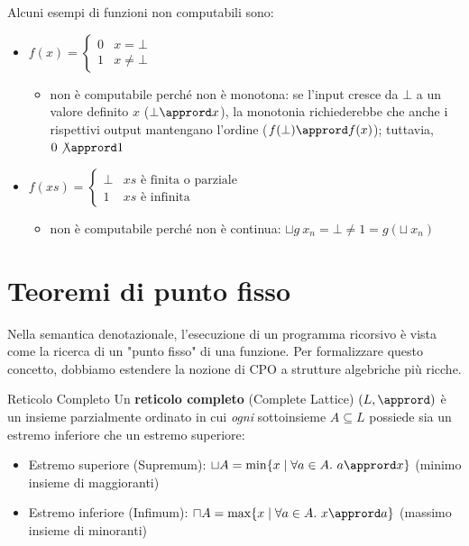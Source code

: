 Alcuni esempi di funzioni non computabili sono:
\begin{itemize}
    \item $
f(x) = \begin{cases}
    0 & x = \bot \\
    1 & x \neq \bot
\end{cases}
$
\begin{itemize}
    \item non è computabile perché non è monotona: se l'input cresce da $\bot$ a un valore definito $x$ ($\bot \apprord x$), la monotonia richiederebbe che anche i rispettivi output mantengano l'ordine ($f(\bot) \apprord f(x)$); tuttavia, $0 \not\apprord 1$
\end{itemize}

\item $
f(xs) = \begin{cases}
    \bot & xs \text{ è finita o parziale}\\
    1 & xs \text{ è infinita}
\end{cases}
$
\begin{itemize}
    \item non è computabile perché non è continua: $\sqcup g \ x_n = \bot \neq 1 = g(\sqcup \ x_n)$
\end{itemize}
\end{itemize}

\section{Teoremi di punto fisso}

Nella semantica denotazionale, l'esecuzione di un programma ricorsivo è vista come la ricerca di un "punto fisso" di una funzione. Per formalizzare questo concetto, dobbiamo estendere la nozione di CPO a strutture algebriche più ricche.

\begin{defframe}{Reticolo Completo}{}
    Un \textbf{reticolo completo} (Complete Lattice) $(L, \apprord)$ è un insieme parzialmente ordinato in cui \textit{ogni} sottoinsieme $A \subseteq L$ possiede sia un estremo inferiore che un estremo superiore:
    \begin{itemize}
        \item Estremo superiore (Supremum): $\sqcup A = \min \{ x \mid \forall a \in A.\ a \apprord x \}$ (minimo insieme di maggioranti)
        \item Estremo inferiore (Infimum): $\sqcap A = \max \{ x \mid \forall a \in A.\ x \apprord a \}$ (massimo insieme di minoranti)
    \end{itemize}
\end{defframe}


